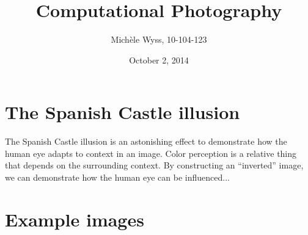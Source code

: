 \documentclass[a4paper]{article}
\title{Computational Photography}
\author{Mich\`ele Wyss, 10-104-123}
\date{October 2, 2014}
\begin{document}
\maketitle
\section*{The Spanish Castle illusion}
The Spanish Castle illusion is an astonishing effect to demonstrate how the human eye adapts to context in an image. 
Color perception is a relative thing that depends on the surrounding context. By constructing an ``inverted'' image, we can demonstrate how the human eye can be influenced... 
\section*{Example images}
\end{document}
